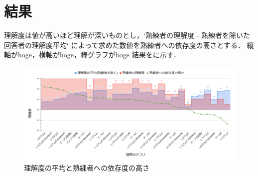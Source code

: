 \section{結果}

理解度は値が高いほど理解が深いものとし，`熟練者の理解度 - 熟練者を除いた回答者の理解度平均` によって求めた数値を熟練者への依存度の高さとする．
縦軸がhoge，横軸がhoge，棒グラフがhoge
結果をに示す．

\begin{figure}[t]
	\centering
	\includegraphics[keepaspectratio,width=0.9\linewidth]{img/rikai.png}
	\caption{理解度の平均と熟練者への依存度の高さ}
	\label{img:rikai}
\end{figure}
